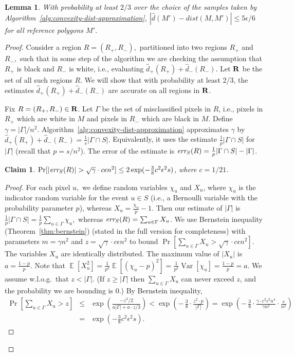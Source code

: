 \documentclass[11pt,english]{article}
\newtheorem{lemma}[theorem]{Lemma}
\newtheorem{claim}[theorem]{Claim}
\numberwithin{figure}{section}
\newcommand{\dis}{dist}
\newcommand{\stripset}{{\bf R}}
\newcommand{\err}{\mbox{\it err}_S}
\DeclareMathOperator*{\E}{\mathbb E}
\DeclareMathOperator*{\Var}{\mathrm Var}
\newcommand{\mydelta}{\epsilon} \newcommand{\bigdelta}{{\epsilon_0}} \newcommand{\dsquares}{d_{\rm squares}}
\newcommand{\dout}{\hat{d}}
\begin{document}
\begin{lemma}\label{lem:accuracy-on-ref-polygons}
With probability at least $2/3$ over the choice of the samples taken by Algorithm~\ref{alg:convexity-dist-approximation},
$|\dout(M')-\dis(M,M')|\leq 5\mydelta/6$ for all reference polygons $M'$.
\end{lemma}
\begin{proof}

Consider a region $R=(R_+,R_-),$ partitioned into two regions $R_+$ and $R_-,$ such that in some step of the algorithm we are checking the assumption that $R_+$ is black and $R_-$ is white, i.e., evaluating $\dout_+(R_+)+\dout_-(R_-).$ Let $\stripset$ be the set of all such regions $R$. We will show that with probability at least 2/3, the estimates $\dout_+(R_+)+\dout_-(R_-)$ are accurate on all regions in $\stripset$.

Fix $R=(R_+,R_-)\in\stripset$. Let $\Gamma$ be the set of misclassified pixels in $R$, i.e., pixels in $R_+$ which are white in $M$ and pixels in $R_-$ which are black in $M$. Define $\gamma=|\Gamma|/n^2$. Algorithm~\ref{alg:convexity-dist-approximation} approximates $\gamma$ by $\dout_+(R_+)+\dout_-(R_-)=\frac 1 s |\Gamma\cap S|.$ Equivalently, it uses the estimate $\frac 1 p |\Gamma\cap S|$ for $|\Gamma|$ (recall that $p=s/n^2$). The error of the estimate is $\err(R)=\frac 1 p |\Gamma\cap S|-|\Gamma|$.

\begin{claim}\label{claim:error-for-R}
$\Pr[|\err(R)|> \sqrt\gamma\cdot c\mydelta n^2]\leq 2\exp(-\frac 3 8 c^2\mydelta^2 s)$, where $c=1/21$.
\end{claim}

\begin{proof}
For each pixel $u,$ we define random variables $\chi_u$ and $X_u$,
where $\chi_u$ is the indicator random variable for the event $u\in S$ (i.e., a Bernoulli variable with the probability parameter $p$), whereas $X_u=\frac{\chi_u}p-1$.
Then our estimate of $|\Gamma|$ is $\frac 1 p |\Gamma\cap S|=\frac 1 p\sum_{u\in\Gamma}\chi_u,$ whereas
$\err(R)=\sum_{u\in\Gamma}X_u$. We use Bernstein inequality
\ifnum{}
(Theorem~\ref{thm:bernstein})
\else
(stated in the {\color{black} full version} for completeness)
\fi
with parameters
$m=\gamma n^2$ and $z=\sqrt\gamma\cdot c\mydelta n^2$ to bound $\Pr[\sum_{u\in\Gamma}X_u> \sqrt\gamma\cdot c\mydelta n^2]$.
The variables $X_u$ are identically distributed. The maximum value of $|X_u|$ is $a=\frac{1-p}{p}$. Note that
$\E[X_u^2]=\frac 1 {p^2}\E[(\chi_u -p)^2]=\frac 1 {p^2}\Var[\chi_u]=\frac{1-p}{p}=a$.
We assume w.l.o.g.\ that $z<|\Gamma|.$ (If $z\geq |\Gamma|$ then $\sum_{u\in\Gamma}X_u$ can never exceed $z$, and the probability we are bounding is 0.)
By Bernstein inequality,
\begin{eqnarray*}
\Pr\left[\sum_{u\in\Gamma}X_u>z\right]&\le& \exp \left(\frac{-z^2/2}{a|\Gamma|+a\cdot z/3}\right)
<\exp\left(-\,\frac 3 8 \cdot \frac{z^2\cdot p}{|\Gamma|}\right)=\exp\left(-\,\frac 3 8 \cdot \frac{\gamma\cdot c^2\mydelta^2n^4}{\gamma n^2}\cdot \frac s {n^2}\right)\\
&=&\exp(-\frac 3 8 c^2\mydelta^2 s).
\end{eqnarray*}


\end{proof}
\end{proof}
\end{document}
